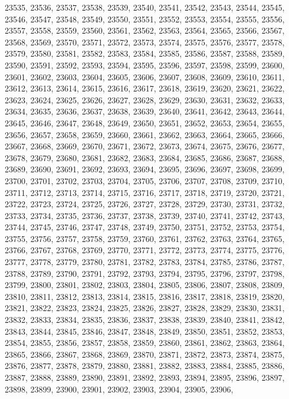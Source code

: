 23535,
23536,
23537,
23538,
23539,
23540,
23541,
23542,
23543,
23544,
23545,
23546,
23547,
23548,
23549,
23550,
23551,
23552,
23553,
23554,
23555,
23556,
23557,
23558,
23559,
23560,
23561,
23562,
23563,
23564,
23565,
23566,
23567,
23568,
23569,
23570,
23571,
23572,
23573,
23574,
23575,
23576,
23577,
23578,
23579,
23580,
23581,
23582,
23583,
23584,
23585,
23586,
23587,
23588,
23589,
23590,
23591,
23592,
23593,
23594,
23595,
23596,
23597,
23598,
23599,
23600,
23601,
23602,
23603,
23604,
23605,
23606,
23607,
23608,
23609,
23610,
23611,
23612,
23613,
23614,
23615,
23616,
23617,
23618,
23619,
23620,
23621,
23622,
23623,
23624,
23625,
23626,
23627,
23628,
23629,
23630,
23631,
23632,
23633,
23634,
23635,
23636,
23637,
23638,
23639,
23640,
23641,
23642,
23643,
23644,
23645,
23646,
23647,
23648,
23649,
23650,
23651,
23652,
23653,
23654,
23655,
23656,
23657,
23658,
23659,
23660,
23661,
23662,
23663,
23664,
23665,
23666,
23667,
23668,
23669,
23670,
23671,
23672,
23673,
23674,
23675,
23676,
23677,
23678,
23679,
23680,
23681,
23682,
23683,
23684,
23685,
23686,
23687,
23688,
23689,
23690,
23691,
23692,
23693,
23694,
23695,
23696,
23697,
23698,
23699,
23700,
23701,
23702,
23703,
23704,
23705,
23706,
23707,
23708,
23709,
23710,
23711,
23712,
23713,
23714,
23715,
23716,
23717,
23718,
23719,
23720,
23721,
23722,
23723,
23724,
23725,
23726,
23727,
23728,
23729,
23730,
23731,
23732,
23733,
23734,
23735,
23736,
23737,
23738,
23739,
23740,
23741,
23742,
23743,
23744,
23745,
23746,
23747,
23748,
23749,
23750,
23751,
23752,
23753,
23754,
23755,
23756,
23757,
23758,
23759,
23760,
23761,
23762,
23763,
23764,
23765,
23766,
23767,
23768,
23769,
23770,
23771,
23772,
23773,
23774,
23775,
23776,
23777,
23778,
23779,
23780,
23781,
23782,
23783,
23784,
23785,
23786,
23787,
23788,
23789,
23790,
23791,
23792,
23793,
23794,
23795,
23796,
23797,
23798,
23799,
23800,
23801,
23802,
23803,
23804,
23805,
23806,
23807,
23808,
23809,
23810,
23811,
23812,
23813,
23814,
23815,
23816,
23817,
23818,
23819,
23820,
23821,
23822,
23823,
23824,
23825,
23826,
23827,
23828,
23829,
23830,
23831,
23832,
23833,
23834,
23835,
23836,
23837,
23838,
23839,
23840,
23841,
23842,
23843,
23844,
23845,
23846,
23847,
23848,
23849,
23850,
23851,
23852,
23853,
23854,
23855,
23856,
23857,
23858,
23859,
23860,
23861,
23862,
23863,
23864,
23865,
23866,
23867,
23868,
23869,
23870,
23871,
23872,
23873,
23874,
23875,
23876,
23877,
23878,
23879,
23880,
23881,
23882,
23883,
23884,
23885,
23886,
23887,
23888,
23889,
23890,
23891,
23892,
23893,
23894,
23895,
23896,
23897,
23898,
23899,
23900,
23901,
23902,
23903,
23904,
23905,
23906,
